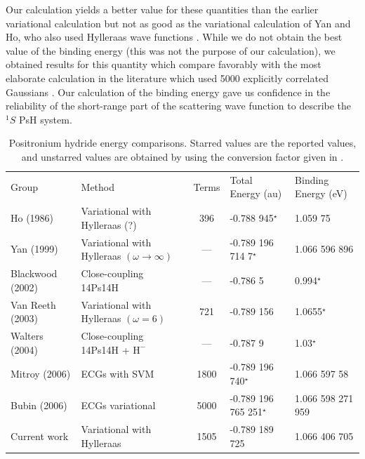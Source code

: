\documentclass[preprint,showpacs,preprintnumbers,amsmath,amssymb]{revtex4}
\begin{document}
Our calculation yields a better value for these
quantities than the earlier variational calculation \cite{VanReeth2003,VanReeth2004}
but not as good as the variational calculation of
Yan and Ho, who also used Hylleraas wave functions \cite{Yan1999}.
While we do not obtain the best value of the binding energy
(this was not the purpose of our calculation),
we obtained results for this quantity which compare favorably with
the most elaborate calculation in the literature which
used 5000 explicitly correlated Gaussians \cite{Bubin2006}.
Our calculation of the binding energy gave us confidence
in the reliability of the short-range part of the
scattering wave function to describe
the $^1S$ PsH system.


\squeezetable  %
\begin{table}[H]
\begin{center}
\begin{ruledtabular}  %
\begin{tabular}{l l c l l}
Group & Method & Terms & Total Energy (au) & Binding Energy (eV)\\
\colrule
Ho (1986) \cite{Ho1986} & Variational with Hylleraas (?) & 396 & -0.788 945$^\star$ & 1.059 75 \\
Yan (1999) \cite{Yan1999} & Variational with Hylleraas $(\omega \rightarrow \infty)$ & --- & -0.789 196 714 7$^\star$ & 1.066 596 896 \\
Blackwood (2002) \cite{Blackwood2002} & Close-coupling 14Ps14H & --- & -0.786 5 & 0.994$^\star$ \\
Van Reeth (2003) \cite{VanReeth2003} & Variational with Hylleraas $(\omega = 6)$ & 721 & -0.789 156 & 1.0655$^\star$ \\
Walters (2004) \cite{Walters2004} & Close-coupling 14Ps14H + $\text{H}^-$ & --- & -0.787 9 & 1.03$^\star$\\
Mitroy (2006) \cite{Mitroy2006} & ECGs with SVM & 1800 & -0.789 196 740$^\star$ & 1.066 597 58 \\
Bubin (2006) \cite{Bubin2006} & ECGs variational & 5000 & -0.789 196 765 251$^\star$ & 1.066 598 271 959 \\
Current work & Variational with Hylleraas & 1505 & -0.789 189 725 & 1.066 406 705 \\
\end{tabular}
\end{ruledtabular}
\caption{Positronium hydride energy comparisons. Starred values are the reported values, and unstarred values are obtained by using the conversion factor given in \cite{NISTConversions}.}
\label{tab:BoundEnergy}
\end{center}
\end{table}
\end{document}
